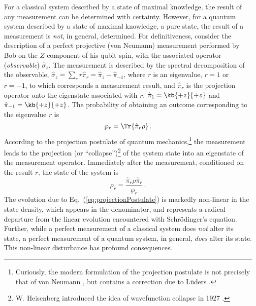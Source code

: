 For a classical system described by a state of maximal knowledge,
the result of any measurement can be determined with certainty. However,
for a quantum system described by a state of maximal knowledge, a
pure state, the result of a measurement is \emph{not}, in general,
determined. For definitiveness, consider the description of a perfect
projective (von Neumann) measurement performed by Bob on the $Z$
component of his qubit spin, with the associated  operator (\emph{observable})
$\hat{\sigma}_{z}$.  The measurement is described by the spectral
decomposition of the observable, $\hat{\sigma}_{z}=\sum_{r}r\hat{\pi}_{r}=\hat{\pi}_{1}-\hat{\pi}_{-1}$,
where $r$ is an eigenvalue, $r=1$ or $r=-1$, to which corresponds
a measurement result, and $\hat{\pi}_{r}$ is the projection operator
onto the eigenstate associated with $r$, $\hat{\pi}_{1}=\kb{+z}{+z}$
and $\hat{\pi}_{-1}=\kb{+z}{+z}$. The probability of obtaining an
outcome corresponding to the eigenvalue $r$ is
\begin{equation}
\wp_{r}=\Tr{\hat{\pi}_{r}\rho}\,.\label{eq:ProbOfprojMsr}
\end{equation}
According to the projection postulate of quantum mechanics,\footnote{Curiously, the modern formulation of the projection postulate is not
precisely that of von Neumann \citep{VonNeumann1932}, but contains
a correction due to Lüders \citep{Luders1951}. } the measurement leads to the projection (or ``collapse'')\footnote{W. Heisenberg introduced the idea of wavefunction collapse in 1927
\citep{Heisenberg1927}.} of the system state into an eigenstate of the measurement operator.
Immediately after the measurement, conditioned on the result $r$,
the state of the system is 
\begin{equation}
\rho_{r}=\frac{\hat{\pi}_{r}\rho\hat{\pi}_{r}}{\wp_{r}}\,.\label{eq:projectionPostulate}
\end{equation}
The evolution due to Eq.~(\ref{eq:projectionPostulate}) is markedly
non-linear in the state density, which appears in the denominator,
and represents a radical departure from the linear evolution encountered
with Schrödinger’s equation. Further, while a perfect measurement
of a classical system does \emph{not} alter its state, a perfect measurement
of a quantum system, in general, \emph{does} alter its state. This
non-linear disturbance has profound consequences.

